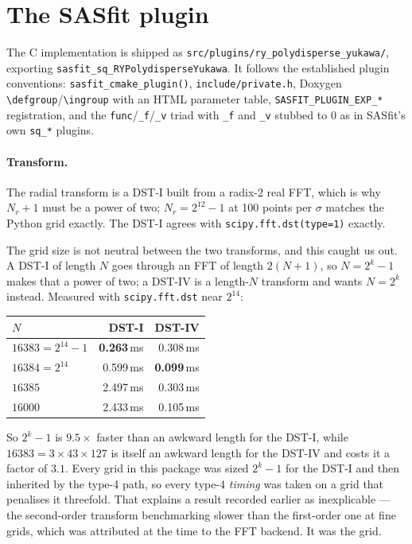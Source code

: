 \documentclass[11pt,a4paper]{article}
\newcommand{\code}[1]{\texttt{\hspace{0pt}#1}}
\begin{document}
\section{The SASfit plugin}

The C implementation is shipped as
\code{src/plugins/ry\_polydisperse\_yukawa/}, exporting
\code{sasfit\_sq\_RYPolydisperseYukawa}. It follows the established plugin
conventions: \code{sasfit\_cmake\_plugin()}, \code{include/private.h}, Doxygen
\code{\textbackslash defgroup}/\code{\textbackslash ingroup} with an HTML
parameter table, \code{SASFIT\_PLUGIN\_EXP\_*} registration, and the
\code{func}/\code{\_f}/\code{\_v} triad with \code{\_f} and \code{\_v} stubbed
to $0$ as in SASfit's own \code{sq\_*} plugins.

\paragraph{Transform.} The radial transform is a DST-I built from a radix-2
real FFT, which is why $N_r+1$ must be a power of two; $N_r=2^{12}-1$ at 100
points per $\sigma$ matches the Python grid exactly. The DST-I agrees with
\code{scipy.fft.dst(type=1)} exactly.

The grid size is not neutral between the two transforms, and this caught us
out. A DST-I of length $N$ goes through an FFT of length $2(N+1)$, so
$N = 2^{k}-1$ makes that a power of two; a DST-IV is a length-$N$ transform
and wants $N = 2^{k}$ instead. Measured with \code{scipy.fft.dst} near
$2^{14}$:

\begin{center}\small
\begin{tabular}{lrr}
\toprule
$N$ & DST-I & DST-IV\\
\midrule
$16383 = 2^{14}-1$ & \textbf{0.263}\,ms & 0.308\,ms\\
$16384 = 2^{14}$   & 0.599\,ms & \textbf{0.099}\,ms\\
$16385$            & 2.497\,ms & 0.303\,ms\\
$16000$            & 2.433\,ms & 0.105\,ms\\
\bottomrule
\end{tabular}
\end{center}

So $2^{k}-1$ is $9.5\times$ faster than an awkward length for the DST-I, while
$16383 = 3\times43\times127$ is itself an awkward length for the DST-IV and
costs it a factor of $3.1$. Every grid in this package was sized $2^{k}-1$ for
the DST-I and then inherited by the type-4 path, so every type-4 \emph{timing}
was taken on a grid that penalises it threefold. That explains a result
recorded earlier as inexplicable --- the second-order transform benchmarking
slower than the first-order one at fine grids, which was attributed at the
time to the FFT backend. It was the grid.
\end{document}
